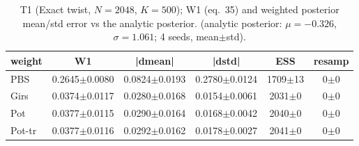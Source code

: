 \begin{table}[ht]
\centering
\caption{T1 (Exact twist, $N=2048$, $K=500$); W1 (eq.~35) and weighted posterior mean/std error vs the analytic posterior. (analytic posterior: $\mu=-0.326$, $\sigma=1.061$; 4 seeds, mean$\pm$std).}
\label{tab:toy_t1_exact}
\begin{tabular}{lccccc}
\toprule
weight & W1 & |dmean| & |dstd| & ESS & resamp \\
\midrule
PBS & 0.2645$\pm$0.0080 & 0.0824$\pm$0.0193 & 0.2780$\pm$0.0124 & 1709$\pm$13 & 0$\pm$0 \\
Girs & 0.0374$\pm$0.0117 & 0.0280$\pm$0.0168 & 0.0154$\pm$0.0061 & 2031$\pm$0 & 0$\pm$0 \\
Pot & 0.0377$\pm$0.0115 & 0.0290$\pm$0.0164 & 0.0168$\pm$0.0042 & 2040$\pm$0 & 0$\pm$0 \\
Pot-tr & 0.0377$\pm$0.0116 & 0.0292$\pm$0.0162 & 0.0178$\pm$0.0027 & 2041$\pm$0 & 0$\pm$0 \\
\bottomrule
\end{tabular}
\end{table}
